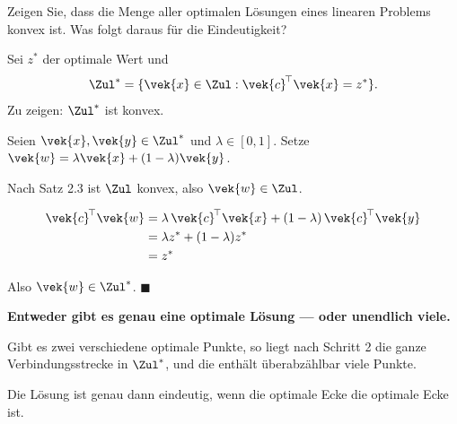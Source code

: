 \begin{aufgabe}
Zeigen Sie, dass die Menge aller optimalen Lösungen eines linearen Problems konvex ist. Was folgt daraus für die Eindeutigkeit?

\loesung
{}
Sei $z^{*}$ der optimale Wert und
\[ \Zul^{*} = \{\vek{x}\in\Zul : \vek{c}^{\!\top}\vek{x} = z^{*}\} . \]
Zu zeigen: $\Zul^{*}$ ist konvex.

Seien $\vek{x},\vek{y} \in \Zul^{*}$ und $\lambda\in[0,1]$. Setze $\vek{w} = \lambda\vek{x}+(1-\lambda)\vek{y}$.

 Nach Satz 2.3 ist $\Zul$ konvex, also $\vek{w} \in \Zul$.

\begin{align*}
\vek{c}^{\!\top}\vek{w} &= \lambda\,\vek{c}^{\!\top}\vek{x} + (1-\lambda)\,\vek{c}^{\!\top}\vek{y}\\
&= \lambda z^{*} + (1-\lambda)z^{*}\\
&= z^{*}
\end{align*}

Also $\vek{w}\in\Zul^{*}$. $\blacksquare$

\begin{center}
\begin{minipage}{0.9\textwidth}
\textbf{Entweder gibt es genau eine optimale Lösung --- oder unendlich viele.}
\end{minipage}
\end{center}

 Gibt es zwei verschiedene optimale Punkte, so liegt nach Schritt 2 die ganze Verbindungsstrecke in $\Zul^{*}$, und die enthält überabzählbar viele Punkte.

\begin{center}
\begin{minipage}{0.88\textwidth}
\end{minipage}
\end{center}

Die Lösung ist genau dann eindeutig, wenn die optimale Ecke die  optimale Ecke ist.


\end{aufgabe}
